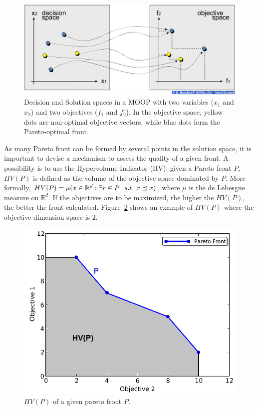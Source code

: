 \documentclass[journal]{IEEEtran}
\begin{document}
\begin{figure} [!t]
	\begin{center}
	\includegraphics[scale=0.235]{img/moopDec.png}
	\caption{Decision and Solution spaces in a MOOP with two variables ($x_1$ and $x_2$) and two objectives ($f_1$ and $f_2$). In the objective space, yellow dots are non-optimal objective vectors, while blue dots form the Pareto-optimal front.}
	\label{fig:moop}
	\end{center}
\end{figure}

As many Pareto front can be formed by several points in the solution space, it is important to devise a mechanism to assess the quality of a given front. A possibility is to use the Hypervolume Indicator (HV): given a Pareto front $P$, $HV(P)$ is defined as the volume of the objective space dominated by $P$. More formally, $HV(P) = \mu (x \in \mathbb{R}^{d} : \exists r \in P \hspace{0.25cm} s.t \hspace{0.25cm} r \preceq x)$, where $\mu$ is the de Lebesgue measure on $\mathbb{R}^{d}$. If the objectives are to be maximized, the higher the $HV(P)$, the better the front calculated. Figure~\ref{fig:hv} shows an example of $HV(P)$ where the objective dimension space is $2$.

\begin{figure}[!t]
\begin{center}
\includegraphics[width=0.75\columnwidth]{img/hv}
\end{center}
\caption{$HV(P)$ of a given pareto front $P$.}
\label{fig:hv}
\end{figure}
\end{document}
